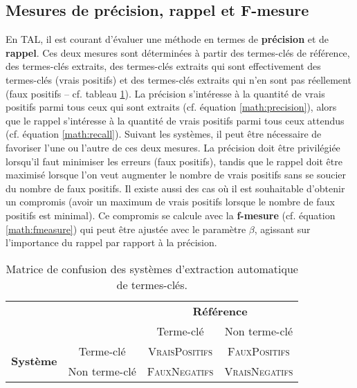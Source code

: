     \subsection{Mesures de précision, rappel et F-mesure}
    \label{subsec:main-state_of_the_art-automatic_evaluation_of_keyphrase_annotation-evaluation-precision_recall_and_f_measure}
      En TAL, il est courant d'évaluer une méthode en termes de
      \textbf{précision} et de \textbf{rappel}. Ces deux mesures sont
      déterminées à partir des termes-clés de référence, des termes-clés
      extraits, des termes-clés extraits qui sont effectivement des
      termes-clés (vrais positifs) et des termes-clés extraits qui n'en sont
      pas réellement (faux positifs -- cf. tableau \ref{tab:confusionmatrix}).
      La précision s'intéresse à la quantité de vrais positifs parmi tous ceux
      qui sont extraits (cf. équation \ref{math:precision}), alors que le
      rappel s'intéresse à la quantité de vrais positifs parmi tous ceux
      attendus (cf. équation \ref{math:recall}). Suivant les systèmes, il peut
      être nécessaire de favoriser l'une ou l'autre de ces deux mesures. La
      précision doit être privilégiée lorsqu'il faut minimiser les erreurs
      (faux positifs), tandis que le rappel doit être maximisé lorsque l'on
      veut augmenter le nombre de vrais positifs sans se soucier du nombre de
      faux positifs. Il existe aussi des cas où il est souhaitable d'obtenir
      un compromis (avoir un maximum de vrais positifs lorsque le nombre de
      faux positifs est minimal). Ce compromis se calcule avec la
      \textbf{f-mesure} (cf. équation \ref{math:fmeasure}) qui peut être
      ajustée avec le paramètre $\beta$, agissant sur l'importance du rappel
      par rapport à la précision.
      \begin{table}
        \begin{center}
          \begin{tabular}{|c|c|c|c|}
            \cline{3-4}
            \multicolumn{2}{c|}{} & \multicolumn{2}{|c|}{\textbf{Référence}}\\
            \cline{3-4}
            \multicolumn{2}{c|}{} & Terme-clé & Non terme-clé\\
            \hline
            \multirow{2}{*}{\textbf{Système}} & Terme-clé & \textsc{VraisPositifs} & \textsc{FauxPositifs}\\
            \cline{2-4}
            & Non terme-clé & \textsc{FauxNegatifs} & \textsc{VraisNegatifs}\\
            \hline
          \end{tabular}
          \caption{Matrice de confusion des systèmes d'extraction automatique de
                   termes-clés. \label{tab:confusionmatrix}}
        \end{center}
      \end{table}
